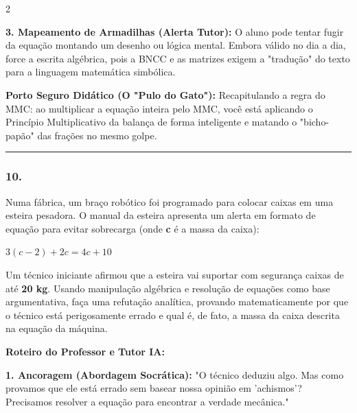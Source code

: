 \begin{multicols*}{2}
\begin{tcolorbox}[colback=CorTitUm!5, colframe=CorTitUm, boxrule=1pt, arc=4pt, left=6pt, right=6pt, top=6pt, bottom=6pt]
    \textbf{3. Mapeamento de Armadilhas (Alerta Tutor):} O aluno pode tentar fugir da equação montando um desenho ou lógica mental. Embora válido no dia a dia, force a escrita algébrica, pois a BNCC e as matrizes exigem a "tradução" do texto para a linguagem matemática simbólica.
    \end{tcolorbox}
    \vspace{0.15cm}
    
    \begin{boxexplicacao}
    \textbf{Porto Seguro Didático (O "Pulo do Gato"):} Recapitulando a regra do MMC: ao multiplicar a equação inteira pelo MMC, você está aplicando o Princípio Multiplicativo da balança de forma inteligente e matando o "bicho-papão" das frações no mesmo golpe.
    \end{boxexplicacao}
\fi

\par\vspace{\espacoQuestao}


\noindent\textcolor{CorLinha}{\rule{\linewidth}{0.5pt}}
\par\vspace{\espacoPreQuestao}
\subsubsection*{10.} 
\begin{enunciadoLiteral}
Numa fábrica, um braço robótico foi programado para colocar caixas em uma esteira pesadora. O manual da esteira apresenta um alerta em formato de equação para evitar sobrecarga (onde \textbf{c} é a massa da caixa):

$ 3(c - 2) + 2c = 4c + 10 $

Um técnico iniciante afirmou que a esteira vai suportar com segurança caixas de até \textbf{20 kg}. Usando manipulação algébrica e resolução de equações como base argumentativa, faça uma refutação analítica, provando matematicamente por que o técnico está perigosamente errado e qual é, de fato, a massa da caixa descrita na equação da máquina.
\end{enunciadoLiteral}

\ifgabarito
    \begin{tcolorbox}[colback=CorTitUm!5, colframe=CorTitUm, boxrule=1pt, arc=4pt, left=6pt, right=6pt, top=6pt, bottom=6pt]
    \small\textbf{\textcolor{CorTitUm}{Roteiro do Professor e Tutor IA:}}\par\vspace{0.1cm}
    \color{CinzaEscuro}
    \textbf{1. Ancoragem (Abordagem Socrática):} "O técnico deduziu algo. Mas como provamos que ele está errado sem basear nossa opinião em 'achismos'? Precisamos resolver a equação para encontrar a verdade mecânica."\par\vspace{0.1cm}
    

\end{tcolorbox}
\end{multicols*}
